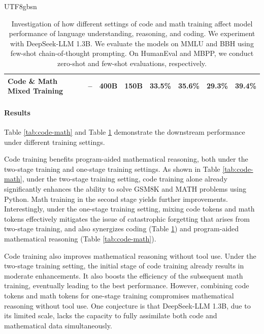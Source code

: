 \documentclass[11pt, a4paper, logo, copyright, nonumbering]{deepseek}
\begin{document}
\begin{CJK*}{UTF8}{gbsn}
\begin{table}[t!]
{\begin{tabular}{llllcccc}
\midrule
Code \& Math Mixed Training & -- & 400B & 150B & 33.5\% & \textbf{35.6\%} & \textbf{29.3\%}             & 39.4\%         \\
\bottomrule
\end{tabular}
    }
    \caption{
    Investigation of how different settings of code and math training affect model performance of language understanding, reasoning, and coding.
    We experiment with DeepSeek-LLM 1.3B.
    We evaluate the models on MMLU and BBH using few-shot chain-of-thought prompting.
    On HumanEval and MBPP, we conduct zero-shot and few-shot evaluations, respectively.
    }
    \label{tab:code-math-general-eval}
    \vspace{-0.2in}
\end{table}
\endgroup

\paragraph{Results}
Table \ref{tab:code-math} and Table \ref{tab:code-math-general-eval} demonstrate the downstream performance under different training settings.

Code training benefits program-aided mathematical reasoning, both under the two-stage training and one-stage training settings.
As shown in Table \ref{tab:code-math}, under the two-stage training setting, code training alone already significantly enhances the ability to solve GSM8K and MATH problems using Python.
Math training in the second stage yields further improvements.
Interestingly, under the one-stage training setting, mixing code tokens and math tokens effectively mitigates the issue of catastrophic forgetting that arises from two-stage training, and also synergizes coding (Table \ref{tab:code-math-general-eval}) and program-aided mathematical reasoning (Table \ref{tab:code-math}).

Code training also improves mathematical reasoning without tool use.
Under the two-stage training setting, the initial stage of code training already results in moderate enhancements.
It also boosts the efficiency of the subsequent math training, eventually leading to the best performance.
However, combining code tokens and math tokens for one-stage training compromises mathematical reasoning without tool use.
One conjecture is that DeepSeek-LLM 1.3B, due to its limited scale, lacks the capacity to fully assimilate both code and mathematical data simultaneously.


\end{CJK*}
\end{document}
